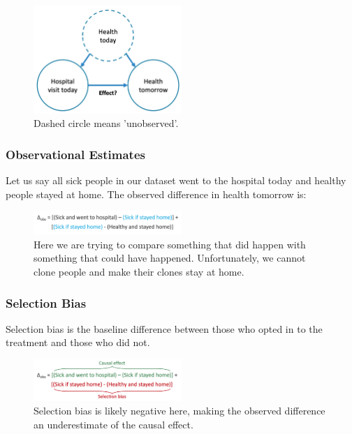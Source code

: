 \begin{figure}[ht]
  \begin{center}
    \includegraphics[width=0.5\textwidth]{figures/confounds.png}
    \caption{Dashed circle means 'unobserved'.}
    \label{fig:confounds}
  \end{center}
\end{figure}

\subsubsection*{Observational Estimates}
Let us say all sick people in our dataset went to the hospital today and healthy people stayed at home. The observed difference in health tomorrow is:

\begin{figure}[ht]
  \begin{center}
    \includegraphics[width=0.5\textwidth]{figures/obs-diff.png}
    \caption{Here we are trying to compare something that did happen with something that could have happened. Unfortunately, we cannot clone people and make their clones stay at home.}
    \label{fig:obs-diff}
  \end{center}
\end{figure}

\subsubsection*{Selection Bias}
Selection bias is the baseline difference between those who opted in to the treatment and those who did not.

\begin{figure}[ht]
  \begin{center}
    \includegraphics[width=0.5\textwidth]{figures/sel-bias.png}
    \caption{Selection bias is likely negative here, making the observed difference an underestimate of the causal effect.}
    \label{fig:sel-bias}
  \end{center}
\end{figure}

